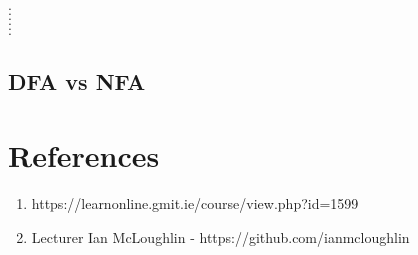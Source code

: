 \documentclass[11pt]{article}
\begin{document}
\begin{description}
\item[$\cdot$] 
\item[$\cdot$]
\item[$\cdot$]
\item[$\cdot$]
\item[$\cdot$]
\item[$\cdot$]
\end{description}

\subsection{DFA vs NFA}


\newpage

\section{References}

\begin{enumerate}
\item https://learnonline.gmit.ie/course/view.php?id=1599
\item Lecturer Ian McLoughlin - https://github.com/ianmcloughlin
\end{enumerate}
\end{document}
